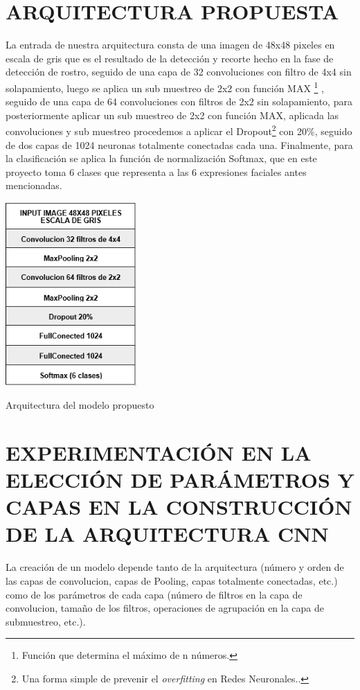 \section{ARQUITECTURA PROPUESTA}
La entrada de nuestra arquitectura consta de una imagen de 48x48 pixeles en
escala de gris que es el resultado de la detección y recorte hecho en la fase de detección
de rostro, seguido de una capa de 32 convoluciones con filtro de 4x4 sin solapamiento,
luego se aplica un sub muestreo de 2x2 con función MAX \footnote[8]{Función que determina el máximo de n números.} , seguido de una capa de 64
convoluciones con filtros de 2x2 sin solapamiento, para posteriormente aplicar un sub
muestreo de 2x2 con función MAX, aplicada las convoluciones y sub muestreo
procedemos a aplicar el Dropout\footnote[9]{Una forma simple de prevenir el \textit{overfitting} en Redes Neuronales..} con 20\%, seguido de dos capas de 1024 neuronas
totalmente conectadas cada una. Finalmente, para la clasificación se aplica la función de
normalización Softmax, que en este proyecto toma 6 clases que representa a las 6
expresiones faciales antes mencionadas.
\vspace{0.5cm}
\begin{table}[H]
    \centering
    \includegraphics[width=50mm]{./Imagenes/tabla_arquitectura.png}
    \caption{Arquitectura del modelo propuesto}
    \label{tab:tabla_arquitectura}
\end{table}

\section{EXPERIMENTACIÓN EN LA ELECCIÓN DE PARÁMETROS Y CAPAS EN LA CONSTRUCCIÓN DE LA ARQUITECTURA
CNN}

La creación de un modelo depende tanto de la arquitectura (número y
orden de las capas de convolucion, capas de Pooling, capas totalmente conectadas,
etc.) como de los parámetros de cada capa (número de filtros en la capa de
convolucion, tamaño de los filtros, operaciones de agrupación en la capa de
submuestreo, etc.).

